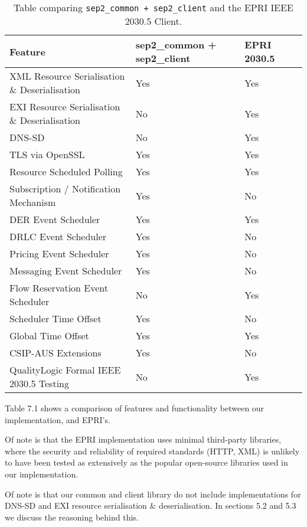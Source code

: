 \begin{table}[h]
	\centering
	\begin{tabular}{llll}
		\toprule
		\textbf{Feature} & \textbf{sep2\_common + sep2\_client} & \textbf{EPRI 2030.5}\\
		\midrule
		XML Resource Serialisation \& Deserialisation & Yes & Yes \\
		EXI Resource Serialisation \& Deserialisation & No  & Yes \\
		DNS-SD                                        & No  & Yes \\
		TLS via OpenSSL                               & Yes  & Yes \\
		Resource Scheduled Polling                    & Yes & Yes \\
		Subscription / Notification Mechanism         & Yes & No \\
		DER Event Scheduler                           & Yes & Yes \\
		DRLC Event Scheduler                          & Yes & No \\
		Pricing Event Scheduler                    	  & Yes & No \\
		Messaging Event Scheduler                     & Yes & No \\
		Flow Reservation Event Scheduler              & No  & Yes \\
		Scheduler Time Offset                         & Yes & No \\
		Global Time Offset                            & Yes & Yes \\
		CSIP-AUS Extensions                           & Yes & No \\
		QualityLogic Formal IEEE 2030.5 Testing       & No  & Yes \\
		\bottomrule
	\end{tabular}
	\caption{Table comparing \texttt{sep2\_common + sep2\_client} and the EPRI IEEE 2030.5 Client.}
	\label{tab:comparsiontable}
\end{table}

Table 7.1 shows a comparison of features and functionality between our implementation, and EPRI's.

Of note is that the EPRI implementation uses minimal third-party libraries, where the security and reliability of required standards (HTTP, XML) is unlikely to have been tested as extensively as the popular open-source libraries used in our implementation.

Of note is that our common and client library do not include implementations for DNS-SD and EXI resource serialisation \& deserialisation. In sections 5.2 and 5.3 we discuss the reasoning behind this. 

